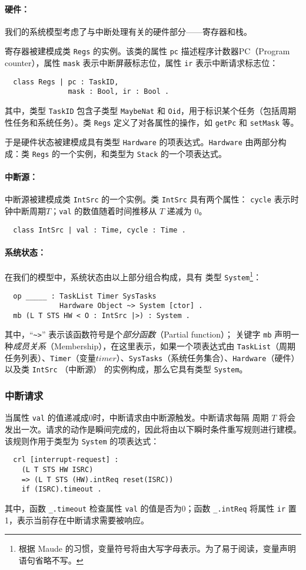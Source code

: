 \paragraph{硬件：}
我们的系统模型考虑了与中断处理有关的硬件部分——寄存器和栈。

寄存器被建模成类 \verb|Regs| 的实例。该类的属性 \verb|pc| 描述程序计数器PC（Program counter），属性 \verb|mask| 表示中断屏蔽标志位，属性 \verb|ir| 表示中断请求标志位： 
\begin{verbatim}
  class Regs | pc : TaskID, 
               mask : Bool, ir : Bool .
\end{verbatim}
其中，类型 \verb|TaskID| 包含子类型 \verb|MaybeNat| 和 \verb|Oid|，用于标识某个任务（包括周期性任务和系统任务）。类 \verb|Regs| 定义了对各属性的操作，如 \verb|getPc| 和 \verb|setMask| 等。

于是硬件状态被建模成具有类型 \verb|Hardware| 的项表达式。\verb|Hardware| 由两部分构成：类 \verb|Regs| 的一个实例，和类型为 \verb|Stack| 的一个项表达式。

\paragraph{中断源：}
中断源被建模成类 \verb|IntSrc| 的一个实例。类 \verb|IntSrc| 具有两个属性：
 \verb|cycle| 表示时钟中断周期$T$；\verb|val| 的数值随着时间推移从 $T$ 递减为 $0$。
\begin{verbatim}
  class IntSrc | val : Time, cycle : Time .
\end{verbatim}

\paragraph{系统状态：}
在我们的模型中，系统状态由以上部分组合构成，具有
类型 \verb|System|\footnote{根据 Maude 的习惯，变量符号将由大写字母表示。为了易于阅读，变量声明语句省略不写。}：
\begin{verbatim}
  op _____ : TaskList Timer SysTasks 
             Hardware Object ~> System [ctor] .
  mb (L T STS HW < O : IntSrc |>) : System .
\end{verbatim}
其中，``\verb|~>|'' 表示该函数符号是个\emph{部分函数}（Partial function）；
关键字 \verb|mb| 声明一种\emph{成员关系}（Membership），在这里表示，如果一个项表达式由 \verb|TaskList|（周期任务列表）、\verb|Timer|（变量$\mathit{timer}$）、\verb|SysTasks|（系统任务集合）、\verb|Hardware|（硬件） 以及类 \verb|IntSrc| （中断源） 的实例构成，那么它具有类型 \verb|System|。

\subsubsection{中断请求}
\label{ss:ir}
当属性 \verb|val| 的值递减成0时，中断请求由中断源触发。中断请求每隔
周期 $T$ 将会发出一次。请求的动作是瞬间完成的，因此将由以下瞬时条件重写规则进行建模。该规则作用于类型为 \verb|System| 的项表达式：
\begin{verbatim}
  crl [interrupt-request] :
    (L T STS HW ISRC) 
    => (L T STS (HW).intReq reset(ISRC))
    if (ISRC).timeout .
\end{verbatim}
其中，函数 \verb|_.timeout| 检查属性 \verb|val| 的值是否为0；函数 \verb|_.intReq| 将属性 \verb|ir| 置1，表示当前存在中断请求需要被响应。

